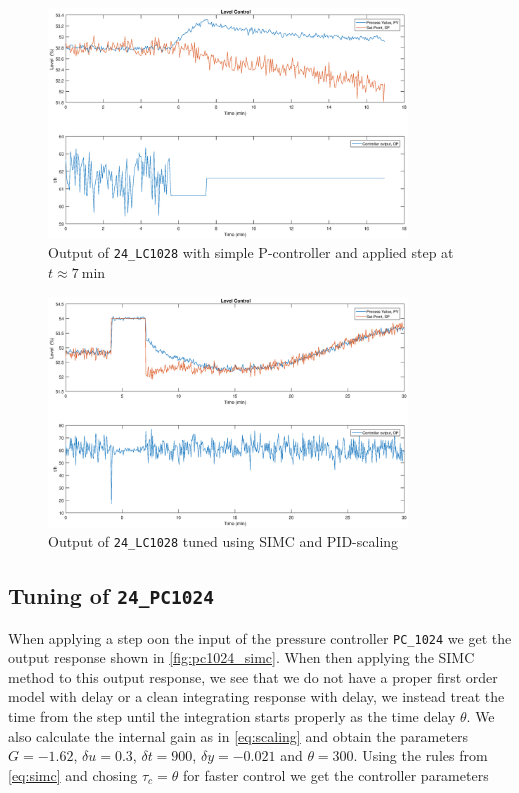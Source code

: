 \begin{figure}[ht!]
	\centering
	\includegraphics[width=0.85\textwidth]{fig/tuning/LC1028_simc.eps}
	\caption{Output of \texttt{24\_LC1028} with simple P-controller and applied step at $t \approx \SI{7}{\minute}$}
	\label{fig:lc1028_simc}
\end{figure}

\begin{figure}[ht!]
	\centering
	\includegraphics[width=0.85\textwidth]{fig/tuning/LC1028_tuned.eps}
	\caption{Output of \texttt{24\_LC1028} tuned using SIMC and PID-scaling}
	\label{fig:lc1028_tuned}
\end{figure}


\subsection{Tuning of \texttt{24\_PC1024}}
When applying a step oon the input of the pressure controller \texttt{PC\_1024} we get the output response shown in \autoref{fig:pc1024_simc}. When then applying the SIMC method to this output response, we see that we do not have a proper first order model with delay or a clean integrating response with delay, we instead treat the time from the step until the integration starts properly as the time delay $\theta$. We also calculate the internal gain as in \eqref{eq:scaling} and obtain the parameters $G = -1.62$, $\delta u = 0.3$, $\delta t = 900$, $\delta y = -0.021$ and $\theta = 300$. Using the rules from \eqref{eq:simc} and chosing $\tau_c = \theta$ for faster control we get the controller parameters

